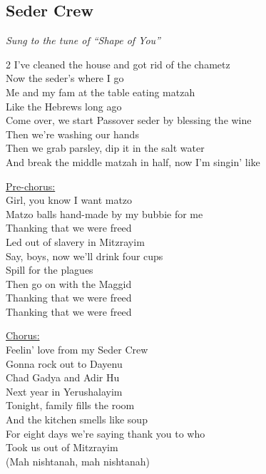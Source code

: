 \pagebreak
\subsection*{Seder Crew}
\textit{Sung to the tune of ``Shape of You''}

\begin{multicols}{2}
I've cleaned the house and got rid of the chametz \\
Now the seder's where I go \\
Me and my fam at the table eating matzah \\
Like the Hebrews long ago \\
Come over, we start Passover seder by blessing the wine \\
Then we're washing our hands \\
Then we grab parsley, dip it in the salt water \\
And break the middle matzah in half, now I'm singin' like

\begin{minipage}[t]{\linewidth}
    \underline{Pre-chorus:} \\
    Girl, you know I want matzo \\
    Matzo balls hand-made by my bubbie for me \\
    Thanking {\god} that we were freed \\
    Led out of slavery in Mitzrayim \\
    Say, boys, now we'll drink four cups \\
    Spill for the plagues \\
    Then go on with the Maggid \\
    Thanking {\god} that we were freed \\
    Thanking {\god} that we were freed
\end{minipage}

\begin{minipage}[t]{\linewidth}
    \underline{Chorus:} \\
    Feelin' love from my Seder Crew \\
    Gonna rock out to Dayenu \\
    Chad Gadya and Adir Hu \\
    Next year in Yerushalayim \\
    Tonight, family fills the room \\
    And the kitchen smells like soup \\
    For eight days we're saying thank you to {\god} who \\
    Took us out of Mitzrayim \\
    (Mah nishtanah, mah nishtanah)
\end{minipage}


\end{multicols}
